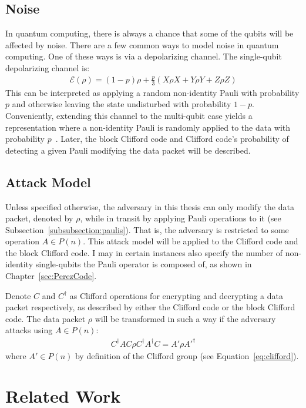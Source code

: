 \section{Noise}
\label{subsec:noise}
In quantum computing, there is always a chance that some of the qubits will be affected by noise. There are a few common ways to model noise in quantum computing. One of these ways is via a depolarizing channel. The single-qubit depolarizing channel is:
\begin{align}
\mathcal{E}(\rho)=(1-p) \rho+\frac{p}{3}(X \rho X+Y \rho Y+Z \rho Z)
\end{align}
This can be interpreted as applying a random non-identity Pauli with probability $p$ and otherwise leaving the state undisturbed with probability $1-p$. Conveniently, extending this channel to the multi-qubit case yields a representation where a non-identity Pauli is randomly applied to the data with probability $p$~\cite{qiskitDepolarizingChannel}. Later, the block Clifford code and Clifford code's probability of detecting a given Pauli modifying the data packet will be described.

\section{Attack Model}
\label{section:attackModel}
Unless specified otherwise, the adversary in this thesis can only modify the data packet, denoted by $\rho$, while in transit by applying Pauli operations to it (see Subsection~\ref{subsubsection:paulis}). That is, the adversary is restricted to some operation $A \in P(n)$. This attack model will be applied to the Clifford code and the block Clifford code. I may in certain instances also specify the number of non-identity single-qubits the Pauli operator is composed of, as shown in Chapter~\ref{sec:PerezCode}. 

Denote $C$ and $C^{\dagger}$ as Clifford operations for encrypting and decrypting a data packet respectively, as described by either the Clifford code or the block Clifford code. The data packet $\rho$ will be transformed in such a way if the adversary attacks using $A \in P(n)$: 
\begin{align}
C^{\dagger}AC \rho C^{\dagger}A^{\dagger}C = A' \rho A'^{\dagger}
\end{align}
where $A' \in P(n)$ by definition of the Clifford group (see Equation~\eqref{eq:clifford}).

\chapter{Related Work}
\label{sec:relatedWork}

